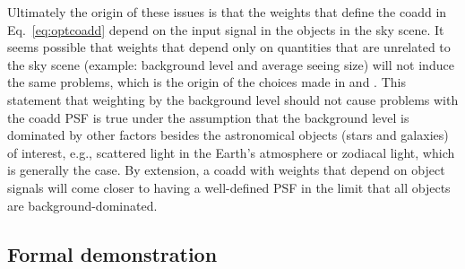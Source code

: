 \documentclass{aastex63}
\newcommand{\irresponse}[1]{{#1}}
\begin{document}
Ultimately the origin of these issues is that the weights that define the coadd in Eq.~\eqref{eq:optcoadd} depend on the input signal in the objects in the sky scene.  It seems possible that weights that depend only on quantities that are unrelated to the sky scene (example: background level and average seeing size) will not induce the same problems, which is the origin of the choices made in \citet{2014ApJ...794..120A} and \citet{2017ApJ...836..187Z}.  \irresponse{This statement that weighting by the background level should not cause problems with the coadd PSF is true under the assumption that the background level is dominated by other factors besides the astronomical objects (stars and galaxies) of interest, e.g., scattered light in the Earth's atmosphere or zodiacal light, which is generally the case.} By extension, a coadd with weights that depend on object signals will come closer to having a well-defined PSF in the limit that all objects are background-dominated.

 \subsection{Formal demonstration}\label{subsec:formal}
\end{document}
